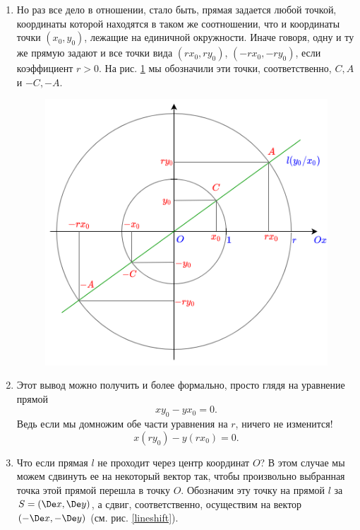 \begin{enumerate}
\item Но раз все дело в отношении, стало быть, прямая задается любой точкой, координаты которой находятся в таком же соотношении, что и координаты точки $(x_0,y_0)$, лежащие на единичной окружности. Иначе говоря, одну и ту же прямую задают и все точки вида $(rx_0,ry_0)$, $(-rx_0,-ry_0)$, если коэффициент $r>0$. На рис. \ref{line} мы обозначили эти точки, соответственно, $C,A$ и $-C,-A$.
\begin{figure}[hbt!]
\begin{center}
\includegraphics[scale=0.3]{line.png}
\end{center}
\caption{}\label{line}
\end{figure}
\item Этот вывод можно получить и более формально, просто глядя на уравнение прямой
$$
xy_0-yx_0=0.
$$
Ведь если мы домножим обе части уравнения на $r$, ничего не изменится!
$$
x(ry_0)-y(rx_0)=0.
$$
\item Что если прямая $l$ не проходит через центр координат $O$? В этом случае мы можем сдвинуть ее на некоторый вектор так, чтобы произвольно выбранная точка этой прямой перешла в точку $O$. Обозначим эту точку на прямой $l$ за $S=(\De x,\De y)$, а сдвиг, соответственно, осуществим на вектор $(-\De x,-\De y)$ (см. рис. \ref{lineshift}).
\begin{figure}[hbt!]
\begin{center}

\end{center}
\end{figure}
\end{enumerate}
